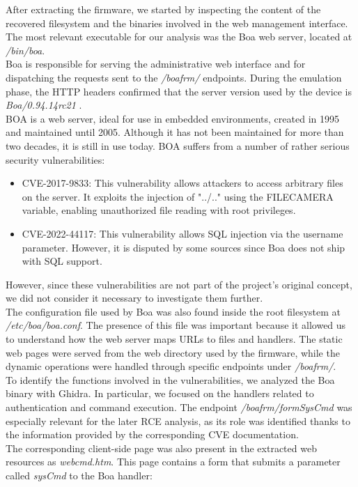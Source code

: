               After extracting the firmware, we started by inspecting the content of the recovered filesystem and the binaries involved in the web management interface. The most relevant executable for our analysis was
              the Boa web server, located at \emph{/bin/boa}.
              \\
              Boa is responsible for serving the administrative web interface and for dispatching the requests sent to the \emph{/boafrm/} endpoints. During the emulation phase, the HTTP headers confirmed that the
              server version used by the device is \emph{Boa/0.94.14rc21} \cite{mandomat}.
              \\
              BOA is a web server, ideal for use in embedded environments, created in 1995 and maintained until 2005. 
              Although it has not been maintained for more than two decades, it is still in use today.
              BOA suffers from a number of rather serious security vulnerabilities:
              \begin{itemize}
                  \item CVE-2017-9833: This vulnerability allows attackers to access arbitrary files on the server. It exploits the injection of "../.." using the FILECAMERA variable, enabling unauthorized file reading with root privileges.
                  \item CVE-2022-44117: This vulnerability allows SQL injection via the username parameter. However, it is disputed by some sources since Boa does not ship with SQL support.
              \end{itemize}
              However, since these vulnerabilities are not part of the project's original concept, we did not consider it necessary to investigate them further.
              \\
              The configuration file used by Boa was also found inside the root filesystem at \emph{/etc/boa/boa.conf}. The presence of this file was important because it allowed us to understand how the web server
              maps URLs to files and handlers. The static web pages were served from the web directory used by the firmware, while the dynamic operations were handled through specific endpoints under \emph{/boafrm/}.
              \\
              To identify the functions involved in the vulnerabilities, we analyzed the Boa binary with Ghidra. In particular, we focused on the handlers related to authentication and command execution. The endpoint \emph{/boafrm/formSysCmd} was especially relevant for the later RCE analysis, as its role was identified thanks to the information provided by the corresponding CVE documentation. \cite{mandomat}
              \\
              The corresponding client-side page was also present in the extracted web resources as \emph{webcmd.htm}. This page contains a form that submits a parameter called \emph{sysCmd} to the Boa handler:

